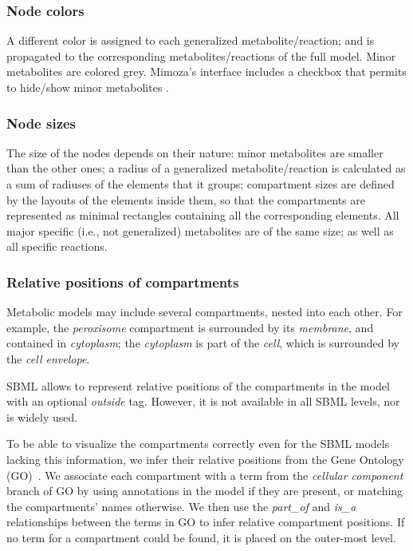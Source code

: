 \documentclass{bmcart}
\begin{document}
\subsubsection*{Node colors}

A different color is assigned to each generalized metabolite/reaction; and is propagated to the corresponding metabolites/reactions of the full model. Minor metabolites are colored grey. Mimoza's interface includes a checkbox that permits to hide/show minor metabolites .

\subsubsection*{Node sizes}

The size of the nodes depends on their nature: minor metabolites are smaller than the other ones; a radius of a generalized metabolite/reaction is calculated as a sum of radiuses of the elements that it groups; compartment sizes are defined by the layouts of the elements inside them, so that the compartments are represented as minimal rectangles containing all the corresponding elements. All major specific (i.e., not generalized) metabolites are of the same size; as well as all specific reactions.

\subsubsection*{Relative positions of compartments}
Metabolic models may include several compartments, nested into each other. For example, the \emph{peroxisome} compartment is surrounded by its \emph{membrane}, and contained in \emph{cytoplasm}; the \emph{cytoplasm} is part of the \emph{cell}, which is surrounded by the \emph{cell envelope}.

SBML allows to represent relative positions of the compartments in the model with an optional \emph{outside} tag. However, it is not available in all SBML levels, nor is widely used.

To be able to visualize the compartments correctly even for the SBML models lacking this information, we infer their relative positions from the Gene Ontology (GO)~\cite{Ashburner2000}. We associate each compartment with a term from the \emph{cellular component} branch of GO by using annotations in the model if they are present, or matching the compartments' names otherwise. We then use the \emph{part\_of} and \emph{is\_a} relationships between the terms in GO to infer relative compartment positions. If no term for a compartment could be found, it is placed on the outer-most level. 
\end{document}
